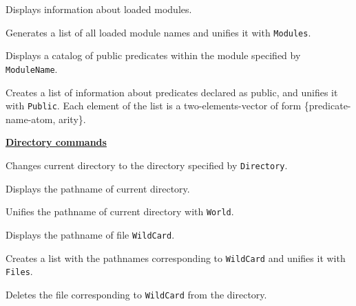 \begin{itemize}
Displays information about loaded modules.

Generates a list of all loaded module names and unifies it with \verb|Modules|.

Displays a catalog of public predicates within
the module specified by \verb|ModuleName|.

Creates a list of information about 
predicates declared as public, and unifies it with
\verb|Public|. Each element of the list is a two-elements-vector of form
\{predicate-name-atom, arity\}.

\end{itemize}
\vspace{1ex}

\noindent\underline{\bf Directory commands}
\vspace{1ex}\par
\begin{itemize}

Changes current directory to the directory specified by \verb|Directory|.

Displays the pathname of current directory.

Unifies the pathname of current directory with \verb|World|.

Displays the pathname of file \verb|WildCard|.

Creates a list with the pathnames corresponding to \verb|WildCard|
and unifies it with \verb|Files|.

Deletes the file corresponding to \verb|WildCard| from the directory.

\end{itemize}
\vspace{1ex}

